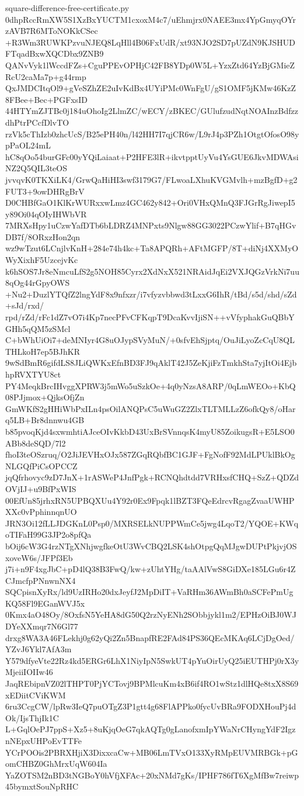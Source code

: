 \documentclass[11pt]{article}
\theoremstyle{definition}
\theoremstyle{remark}
\begin{document}
\begin{filecontents*}[overwrite]{square-difference-free-certificate.py}
0dhpRccRmXW5S1XzBxYUCTM1cxoxM4c7/uEhmjrx0NAEE3mx4YpGmyqOYrzAVB7R6MToNOKkCSec
+R3Wm3RUWKPzvuNJEQ8LqHll4B06FxUdR/xt93NJO2SD7pUZdN9KJSHUDFTqadBxwXQCDbx9ZNB9
QANvVyk1lWccdFZs+CguPPEvOPHjC42FB8YDp0W5L+YzxZtd64YzBjGMieZRcU2caMa7p+g44rmp
QxJMDCItqOl9+gVeSZhZE2uIvKdBx4UYiPMc0WnFgU/gS1OMF5jKMw46KzZ8FBee+Bec+PGFxsID
44HTYmZJTBc0j184uOhoIg2LlmZC/wECY/zBKEC/GUlufzudNqtNOAInzBdfzzdhPtrPCcfDlvTO
rzVk5cThIzb0zhcUcS/B25ePH40n/l42HH7I7qjCR6w/L9rJ4p3PZh1OtgtOfosO98ypPaOL24mL
hC8qOo54burGFc00yYQiLaiaat+P2HFE3lR+ikvtpptUyVu4YsGUE6JkvMDWAsiNZ2Q5QIL3teOS
jvvqvK0TKXiLK4/GrwQaHiHI3swf3179G7/FLwoaLXhuKVGMvlh+mzBgfD+g2FUT3+9owDHRgBrV
D0CHBfGaO1KlKrWURxxwLmz4GC462y842+Ori0VHxQMnQ3FJGrRgJiwepI5y89Oi04qOIyIHWbVR
7MRXsHpy1uCzwYafDTb6bLDRZ4MNPxts9Nlgw88GG3022PCzwYlif+B7qHGvDB7f/8ORxzHon2qn
wz9wTzut6LCnjlvKnH+284e74h4kc+Ta8APQRh+AFtMGFP/8T+diNj4XXMyOWyXixhF5UzcejvKc
k6hSOS7Jr8eNmcuLfS2g5NOH85Cyrx2XdNxX521NRAidJqEi2VXJQGzVrkNi7uu8qOg44rGpyOWS
+Nu2+DuzlYTQfZ2lngYdF8x9nfxzr/i7vfyzvbbwd3tLxxG6IhR/tBd/s5d/shd/sZd+sJd/rxd/
rpd/rZd/rFc1dZ7vO7i4Kp7necPFvCFKqpT9DcaKvvIjiSN++vVfyphakGuQBbYGHh5qQM5zSMcl
C+bWhUiOi7+deMNIyr4G8uOJypSVyMuN/+0sfvEhSjptq/OuJiLyoZcCqU8QLTHLkoH7ep5BJhKR
9wSdBmR6gifdLS8JLiQWKxEfnBD3FJ9qAklT42J5ZeKjiFzTmkhSta7yjItOi4EjbhpRVXTYU8ct
PY4MeqkBrcIHvggXPRW3j5mWo5uSzkOe+4q0yNzsA8ARP/0qLmWEOo+KbQ08PJjmox+QjksOfjZn
GmWKfS2gHHiWbPxILn4psOilANQPsC5uWuGZ2ZlxTLTMLLzZ6ofkQy8/oHarq5LB+Br8dnnwu4GB
b85pvoqKjd4sxwmhtiAJceOIvKkbD43UxBrSVnnqsK4myU85ZoikugsR+E5LSO0ABb8deSQD/7l2
fhoI3teOSzruq/O2JiJEVHxOJx587ZGqRQbfBC1GJF+FgNofF92MdLPUklBkOgNLGQfPiCsOPCCZ
jqQfrhovyc9zD7JnX+1rASWeP4JnfPgk+RCNQhdtdd7VRHxsfCHQ+SzZ+QDZdOVjIJ+u9BfPxWIS
00EfUn85jrhxRN5UPBQXUu4Y92r0Ex9Fpqk1lBZT3FQeEdrcvRgagZvaaUWHPXXc0vPphinnqnUO
JRN3Oi12fLLJDGKnL0Psp0/MXRSELkNUPPWmCe5jwg4LqoT2/YQOE+KWqoTIFaH99G3JP2o8pfQa
bOij6cW3G4rzNTgXNhjwgfkeOtU3WvCBQ2LSK4shOtpgQqMJgwDUPtPkjvjOSxoveW6s/JFPf3Eb
j7i+n9F4xgJbC+pD4lQ38B3FwQ/kw+zUhtYHg/taAAlVwS8GiDXe185LGu6r4ZCJmcfpPNnwnNX4
SQCpisnXyRx/ld9UzIRHo20dxJeyfJ2MpDiIT+VaRHm36AWmBh0aSCFePmUgKQ58Fl9EGanWVJ5x
0Kmx4aO48Oy/8OxfsN5YeHA8dG50Q2rzNyENh2SObbjykl1m2/EPHzOiBJ0WJDYeXXmqr7N6Gl77
drxg8WA3A46FLekhj0g62yQi2Zn5BnapfRE2FAd84PS36QEcMKAq6LCjDgOed/YZvJ6Ykl7AfA3m
Y579dfyeVte22Rz4kd5ERGr6LhX1NiyIpN5SwkUT4pYuOirUyQ25iEUTHPj0rX3yMjeiiIOIIw46
JaqREbipnVZ02lTHPT0PjYCTovj9BPMlcuKm4xB6if4RO1wStz1dlHQe8txX8S69xEDiitCViKWM
6ru3CcgCW/lpRw3IeQ7puOTgZ3P1gtt4g68FlAPPko0fycUvBRa9FODXHouPj4dOk/IjsThjIk1C
L+GqlOePJ7ppS+Xz5+8uKjqOeG7qkAQTg0gLanofxmIpYWaNrCHyngYdF2IgznNEpxUHPoEvTTFe
YCrPOOis2PBRXHjiX3DixxcaCw+MB06LmTVxO133XyRMpEUVMRBGk+pGomCHBZ0GhMrxUqW604Ia
YaZOTSM2nBD3tNGBoY0hVfjXFAc+20xNMd7gKs/IPHF786fT6XgMfBw7reiwp45bymxtSouNpRHC

\end{filecontents*}
\end{document}
